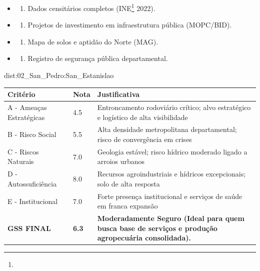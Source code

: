 {\begin{itemize}
\tightlist
\item
  \begin{enumerate}
  \def\labelenumi{\arabic{enumi})}
  \tightlist
  \item
    Dados censitários completos (INE\footnote{\fineINE} 2022).
  \end{enumerate}
\item
  \begin{enumerate}
  \def\labelenumi{\arabic{enumi})}
  \setcounter{enumi}{1}
  \tightlist
  \item
    Projetos de investimento em infraestrutura pública (MOPC/\allowbreak BID).
  \end{enumerate}
\item
  \begin{enumerate}
  \def\labelenumi{\arabic{enumi})}
  \setcounter{enumi}{2}
  \tightlist
  \item
    Mapa de solos e aptidão do Norte (MAG).
  \end{enumerate}
\item
  \begin{enumerate}
  \def\labelenumi{\arabic{enumi})}
  \setcounter{enumi}{3}
  \tightlist
  \item
    Registro de segurança pública departamental.
  \end{enumerate}
\end{itemize}}{dist:02_San_Pedro:San_Estanislao}
\begin{table}[ht!]
\small \begin{tabular}{p{3.0cm}p{0.8cm}p{6.0cm}} \toprule
\textbf{Critério} & \textbf{Nota} & \textbf{Justificativa} \\ \midrule
A - Ameaças Estratégicas & 4.5 & Entroncamento rodoviário crítico; alvo estratégico e logístico de alta visibilidade \\
B - Risco Social & 5.5 & Alta densidade metropolitana departamental; risco de convergência em crises \\
C - Riscos Naturais & 7.0 & Geologia estável; risco hídrico moderado ligado a arroios urbanos \\
D - Autossuficiência & 8.0 & Recursos agroindustriais e hídricos excepcionais; solo de alta resposta \\
E - Institucional & 7.0 & Forte presença institucional e serviços de saúde em franca expansão \\
\midrule \textbf{GSS FINAL} & \textbf{6.3} & \textbf{Moderadamente Seguro (Ideal para quem busca base de serviços e produção agropecuária consolidada).} \\ \bottomrule \end{tabular}
\end{table}
